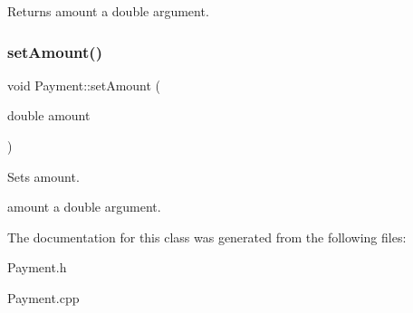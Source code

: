 \begin{DoxyReturn}{Returns}
amount a double argument. 
\end{DoxyReturn}
\mbox{\label{classPayment_ae967c922e523959e20933da449e5d0fd}} 
\subsubsection{\texorpdfstring{set\+Amount()}{setAmount()}}
{\footnotesize\ttfamily void Payment\+::set\+Amount (\begin{DoxyParamCaption}\item[{double}]{amount }\end{DoxyParamCaption})}



Sets amount. 

amount a double argument. 

The documentation for this class was generated from the following files\+:\begin{DoxyCompactItemize}
\item 
Payment.\+h\item 
Payment.\+cpp\end{DoxyCompactItemize}
